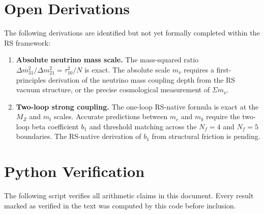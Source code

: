\documentclass[11pt,letterpaper]{article}
\theoremstyle{plain}
\theoremstyle{definition}
\theoremstyle{remark}
\newcommand{\tauX}{\tau_{10}}
\begin{document}
\section{Open Derivations}\label{sec:open}

The following derivations are identified but not yet formally
completed within the RS framework:

\begin{enumerate}
\item \textbf{Absolute neutrino mass scale.}  The mass-squared
ratio $\Delta m^2_{31}/\Delta m^2_{21}=\tauX^2/N$ is exact.  The
absolute scale $m_\nu$ requires a first-principles derivation of
the neutrino mass coupling depth from the RS vacuum structure, or
the precise cosmological measurement of $\Sigma m_\nu$.

\item \textbf{Two-loop strong coupling.}  The one-loop RS-native
formula is exact at the $M_Z$ and $m_t$ scales.  Accurate
predictions between $m_c$ and $m_b$ require the two-loop beta
coefficient $b_1$ and threshold matching across the $N_f=4$ and
$N_f=5$ boundaries.  The RS-native derivation of $b_1$ from
structural friction is pending.
\end{enumerate}

\appendix
\section{Python Verification}\label{app:python}

The following script verifies all arithmetic claims in this
document.  Every result marked as verified in the text was computed
by this code before inclusion.
\end{document}
